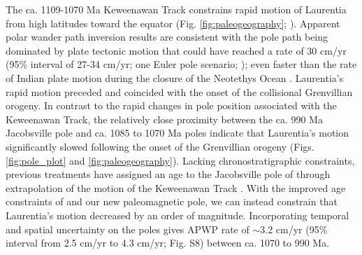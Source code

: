 The ca. 1109-1070 Ma Keweenawan Track constrains rapid motion of Laurentia from high latitudes toward the equator (Fig. \ref{fig:paleogeography}; \cite{Davis1997a, Swanson-Hysell2019a}). Apparent polar wander path inversion results are consistent with the pole path being dominated by plate tectonic motion that could have reached a rate of 30 cm/yr (95\% interval of 27-34 cm/yr; one Euler pole scenario; \cite{Swanson-Hysell2019a, Rose2022a}); even faster than the rate of Indian plate motion during the closure of the Neotethys Ocean \citep{Hinsbergen2022a, Jagoutz2015a}. Laurentia's rapid motion preceded and coincided with the onset of the collisional Grenvillian orogeny. In contrast to the rapid changes in pole position associated with the Keweenawan Track, the relatively close proximity between the ca. 990 Ma Jacobsville pole and ca. 1085 to 1070 Ma poles indicate that Laurentia's motion significantly slowed following the onset of the Grenvillian orogeny (Figs. \ref{fig:pole_plot} and \ref{fig:paleogeography}). Lacking chronostratigraphic constraints, previous treatments have assigned an age to the Jacobsville pole of \cite{Roy1978a} through extrapolation of the motion of the Keweenawan Track \cite[e.g.][]{Li2008a}. With the improved age constraints of \cite{Hodgin2022a} and our new paleomagnetic pole, we can instead constrain that Laurentia's motion decreased by an order of magnitude. Incorporating temporal and spatial uncertainty on the poles gives APWP rate of $\sim$3.2 cm/yr (95\% interval from 2.5 cm/yr to 4.3 cm/yr; Fig. S8) between ca. 1070 to 990 Ma.  


